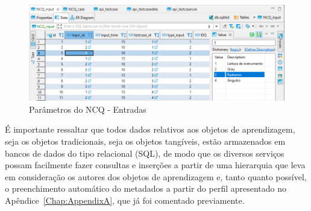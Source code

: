 \begin{figure}[htb]
	\centering
	\includegraphics[width=1\linewidth]{chapters/proposedMethod/tools/NCQ_entradas.png}
	\caption{Parâmetros do NCQ - Entradas}
	\label{fig:NCQ_entradas}
\end{figure}

É importante ressaltar que todos dados relativos aos objetos de aprendizagem, seja os objetos tradicionais, seja os objetos tangíveis, estão armazenados em bancos de dados do tipo relacional (SQL), de modo que os diversos serviços possam facilmente fazer consultas e inserções a partir de uma hierarquia que leva em consideração os autores dos objetos de aprendizagem e, tanto quanto possível, o preenchimento automático do metadados a partir do perfil apresentado no Apêndice~\ref{Chap:AppendixA}, que já foi comentado previamente.


